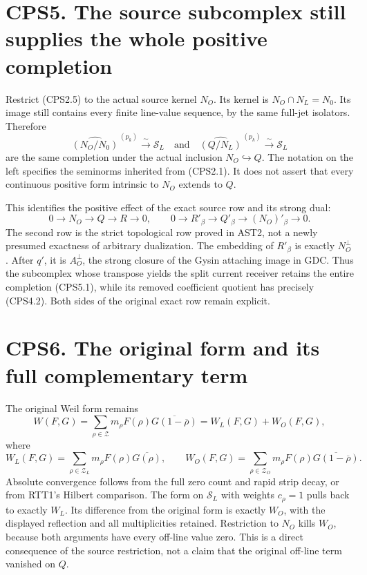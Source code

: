 \section{CPS5. The source subcomplex still supplies the whole positive
completion}\label{cps5.-the-source-subcomplex-still-supplies-the-whole-positive-completion}

Restrict (CPS2.5) to the actual source kernel \(N_O\). Its kernel is
\(N_O\cap N_L=N_0\). Its image still contains every finite line-value
sequence, by the same full-jet isolators. Therefore \[
\widehat{(N_O/N_0)}^{\,(p_k)}\xrightarrow{\sim}\mathcal S_L
\quad\text{and}\quad
\widehat{(Q/N_L)}^{\,(p_k)}\xrightarrow{\sim}\mathcal S_L
\tag{CPS5.1}
\] are the same completion under the actual inclusion
\(N_O\hookrightarrow Q\). The notation on the left specifies the
seminorms inherited from (CPS2.1). It does not assert that every
continuous positive form intrinsic to \(N_O\) extends to \(Q\).

This identifies the positive effect of the exact source row and its
strong dual: \[
0\longrightarrow N_O\longrightarrow Q\longrightarrow R\longrightarrow0,
\qquad
0\longrightarrow R'_\beta\longrightarrow Q'_\beta
\longrightarrow (N_O)'_\beta\longrightarrow0.
\tag{CPS5.2}
\] The second row is the strict topological row proved in AST2, not a
newly presumed exactness of arbitrary dualization. The embedding of
\(R'_\beta\) is exactly \(N_O^\perp\). After \(q'\), it is
\(A_O^\perp\), the strong closure of the Gysin attaching image in GDC.
Thus the subcomplex whose transpose yields the split current receiver
retains the entire completion (CPS5.1), while its removed coefficient
quotient has precisely (CPS4.2). Both sides of the original exact row
remain explicit.

\section{CPS6. The original form and its full complementary
term}\label{cps6.-the-original-form-and-its-full-complementary-term}

The original Weil form remains \[
W(F,G)=\sum_{\rho\in\mathscr Z}m_\rho
F(\rho)\overline{G(1-\overline\rho)}
=W_L(F,G)+W_O(F,G),
\tag{CPS6.1}
\] where \[
W_L(F,G)=\sum_{\rho\in\mathscr Z_L}m_\rho
F(\rho)\overline{G(\rho)},\qquad
W_O(F,G)=\sum_{\rho\in\mathscr Z_O}m_\rho
F(\rho)\overline{G(1-\overline\rho)}.
\tag{CPS6.2}
\] Absolute convergence follows from the full zero count and rapid strip
decay, or from RTT1's Hilbert comparison. The form on \(\mathcal S_L\)
with weights \(c_\rho=1\) pulls back to exactly \(W_L\). Its difference
from the original form is exactly \(W_O\), with the displayed reflection
and all multiplicities retained. Restriction to \(N_O\) kills \(W_O\),
because both arguments have every off-line value zero. This is a direct
consequence of the source restriction, not a claim that the original
off-line term vanished on \(Q\).

